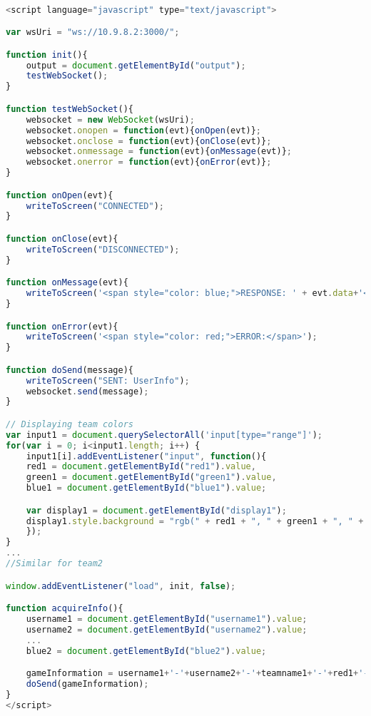 \documentclass[Softwaredesign/Softwaredesign_main.tex]{subfiles}
\begin{document}
\begin{lstlisting}[language=JavaScript, caption={WebPage event handlers}, label=list:webpage_handlers]

<script language="javascript" type="text/javascript">

var wsUri = "ws://10.9.8.2:3000/";

function init(){
    output = document.getElementById("output");
    testWebSocket();
}

function testWebSocket(){
    websocket = new WebSocket(wsUri);
    websocket.onopen = function(evt){onOpen(evt)};
    websocket.onclose = function(evt){onClose(evt)};
    websocket.onmessage = function(evt){onMessage(evt)};
    websocket.onerror = function(evt){onError(evt)};
}

function onOpen(evt){
    writeToScreen("CONNECTED");
}

function onClose(evt){
    writeToScreen("DISCONNECTED");
}

function onMessage(evt){
    writeToScreen('<span style="color: blue;">RESPONSE: ' + evt.data+'</span>');
}

function onError(evt){
    writeToScreen('<span style="color: red;">ERROR:</span>');
}

function doSend(message){
    writeToScreen("SENT: UserInfo");
    websocket.send(message);
}

// Displaying team colors
var input1 = document.querySelectorAll('input[type="range"]');
for(var i = 0; i<input1.length; i++) {
    input1[i].addEventListener("input", function(){
    red1 = document.getElementById("red1").value,
    green1 = document.getElementById("green1").value,
    blue1 = document.getElementById("blue1").value;

    var display1 = document.getElementById("display1");
    display1.style.background = "rgb(" + red1 + ", " + green1 + ", " + blue1 + ")";
    });
}
...
//Similar for team2

window.addEventListener("load", init, false);

function acquireInfo(){
    username1 = document.getElementById("username1").value;
    username2 = document.getElementById("username2").value;
    ...
    blue2 = document.getElementById("blue2").value;

    gameInformation = username1+'-'+username2+'-'+teamname1+'-'+red1+'-'+green1+'-'+blue1+'-'+username3+'-'+username4+'-'+teamname2+'-'+red2+'-'+green2+'-'+blue2+'#';
    doSend(gameInformation);
}
</script>
\end{lstlisting}
\end{document}
